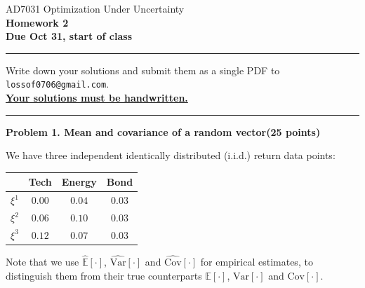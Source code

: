 \documentclass[10pt]{article}
\newcommand{\problem}[2]{%
  \par\bigskip
  {\color{ruleink}\rule{\textwidth}{1pt}}\par\nobreak\vspace{3pt}
  {\large\bfseries #2}\hfill{\normalsize\bfseries(#1 points)}\par\nobreak\vspace{4pt}}
\begin{document}
\begin{center}
  {\large AD7031 Optimization Under Uncertainty}\\[3pt]
  {\Large\bfseries Homework 2}\\[4pt]
  {\small \textbf{Due Oct 31, start of class}}
\end{center}
\medskip\hrule\medskip

Write down your solutions and submit them as a single PDF to
\texttt{lossof0706@gmail.com}.\\
\textbf{\underline{Your solutions must be handwritten.}}

\problem{25}{Problem 1. Mean and covariance of a random vector}

We have three independent identically distributed (i.i.d.) return data points:

\begin{center}
\begin{tabular}{c|ccc}
           & Tech   & Energy & Bond   \\ \hline
 $\xi^1$   & $0.00$ & $0.04$ & $0.03$ \\
 $\xi^2$   & $0.06$ & $0.10$ & $0.03$ \\
 $\xi^3$   & $0.12$ & $0.07$ & $0.03$ \\
\end{tabular}
\end{center}

Note that we use $\widehat{\mathbb{E}}[\cdot]$, $\widehat{\mathrm{Var}}[\cdot]$ and $\widehat{\mathrm{Cov}}[\cdot]$ for empirical
estimates, to distinguish them from their true counterparts $\mathbb{E}[\cdot]$, $\mathrm{Var}[\cdot]$ and $\mathrm{Cov}[\cdot]$.
\end{document}
